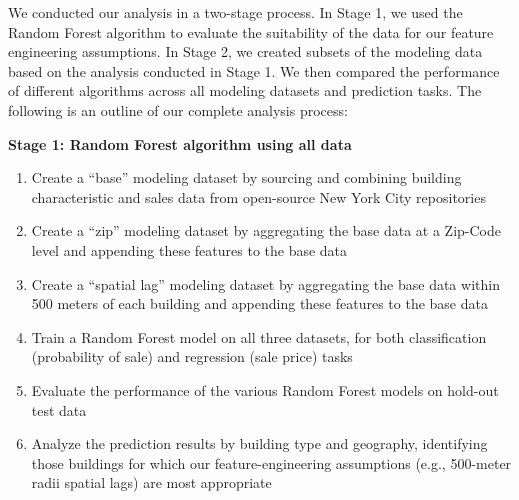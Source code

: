 \documentclass[12pt,]{article}
\providecommand{\tightlist}{%
  \setlength{\itemsep}{0pt}\setlength{\parskip}{0pt}}
\begin{document}
\begin{table}

\caption{\label{tab:model table}\label{tab:modeltable} Six Predictive Models}
\centering
{}
\end{table}

We conducted our analysis in a two-stage process. In Stage 1, we used
the Random Forest algorithm to evaluate the suitability of the data for
our feature engineering assumptions. In Stage 2, we created subsets of
the modeling data based on the analysis conducted in Stage 1. We then
compared the performance of different algorithms across all modeling
datasets and prediction tasks. The following is an outline of our
complete analysis process:\newline

\noindent \textbf{Stage 1: Random Forest algorithm using all data}

\begin{enumerate}
\def\labelenumi{\arabic{enumi})}
\tightlist
\item
  Create a ``base'' modeling dataset by sourcing and combining building
  characteristic and sales data from open-source New York City
  repositories
\item
  Create a ``zip'' modeling dataset by aggregating the base data at a
  Zip-Code level and appending these features to the base data
\item
  Create a ``spatial lag'' modeling dataset by aggregating the base data
  within 500 meters of each building and appending these features to the
  base data
\item
  Train a Random Forest model on all three datasets, for both
  classification (probability of sale) and regression (sale price) tasks
\item
  Evaluate the performance of the various Random Forest models on
  hold-out test data
\item
  Analyze the prediction results by building type and geography,
  identifying those buildings for which our feature-engineering
  assumptions (e.g., 500-meter radii spatial lags) are most
  appropriate\newline
\end{enumerate}
\end{document}
